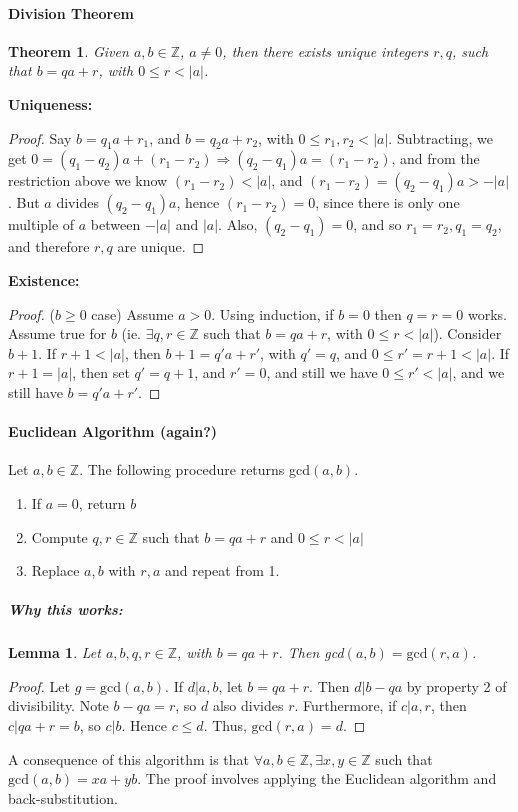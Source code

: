 \documentclass[10pt,letter]{article}
\theoremstyle{plain}
\newtheorem*{theorem*}{Theorem}
\newtheorem*{lemma*}{Lemma}
\theoremstyle{definition}
\begin{document}
\paragraph{Division Theorem}
\begin{theorem*}
Given $a,b\in\mathbb{Z}$, $a\neq0$, then there exists unique integers $r,q$, such that $b=qa+r$, with $0\leq r<|a|$. 
\end{theorem*}
\textbf{Uniqueness:} 
\begin{proof}
Say $b=q_1a+r_1$, and $b=q_2a+r_2$, with $0\leq r_1,r_2<|a|$. Subtracting, we get $0=(q_1-q_2)a+(r_1-r_2)\Rightarrow (q_2-q_1)a=(r_1-r_2)$, and from the restriction above we know $(r_1-r_2)<|a|$, and $(r_1-r_2)=(q_2-q_1)a>-|a|$. But $a$ divides $(q_2-q_1)a$, hence $(r_1-r_2)=0$, since there is only one multiple of $a$ between $-|a|$ and $|a|$. Also, $(q_2-q_1)=0$, and so $r_1=r_2,q_1=q_2$, and therefore $r,q$ are unique. 
\end{proof}
\textbf{Existence:}
\begin{proof}
($b\geq0$ case) Assume $a>0$. Using induction, if $b=0$ then $q=r=0$ works. Assume true for $b$ (ie. $\exists q,r\in\mathbb{Z}$ such that $b=qa+r$, with $0\leq r<|a|$). Consider $b+1$. If $r+1<|a|$, then $b+1=q'a+r'$, with $q'=q$, and $0\leq r'=r+1<|a|$. If $r+1=|a|$, then set $q'=q+1$, and $r'=0$, and still we have $0\leq r'<|a|$, and we still have $b=q'a+r'$. 
\end{proof}

\paragraph{Euclidean Algorithm (again?)}
Let $a,b\in\mathbb{Z}$. The following procedure returns gcd$(a,b)$. 
\begin{enumerate}
    \item If $a=0$, return $b$
    \item Compute $q,r\in\mathbb{Z}$ such that $b=qa+r$ and $0\leq r<|a|$ 
    \item Replace $a,b$ with $r,a$ and repeat from 1.
\end{enumerate}
\subparagraph{Why this works:}
\begin{lemma*}
Let $a,b,q,r\in\mathbb{Z}$, with $b=qa+r$. Then gcd$(a,b)=\text{gcd}(r,a)$. 
\end{lemma*}
\begin{proof}
Let $g=\text{gcd}(a,b)$. If $d|a,b$, let $b=qa+r$. Then $d|b-qa$ by property 2 of divisibility. Note $b-qa=r$, so $d$ also divides $r$. Furthermore, if $c|a,r$, then $c|qa+r=b$, so $c|b$. Hence $c\leq d$. Thus, $\text{gcd}(r,a)=d$.
\end{proof}
A consequence of this algorithm is that $\forall a,b\in\mathbb{Z},\exists x,y\in\mathbb{Z}$ such that $\text{gcd}(a,b)=xa+yb$. The proof involves applying the Euclidean algorithm and back-substitution. 
\end{document}
